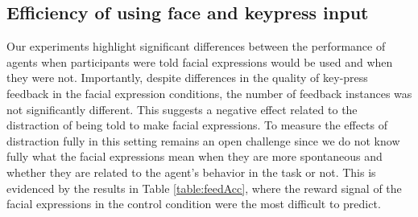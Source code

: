 
\subsection{Efficiency of using face and keypress input}
Our experiments highlight significant differences between the performance of agents when participants were told facial expressions would be used and when they were not. Importantly, despite differences in the quality of key-press feedback in the facial expression conditions, the number of feedback instances was not significantly different. This suggests a negative effect related to the distraction %
of being told to make facial expressions. To measure the effects of distraction %
fully in this setting remains an open challenge since we do not know fully what the facial expressions mean when they are more spontaneous and whether they are related to the agent's behavior in the task or not. This is evidenced by the results in Table \ref{table:feedAcc}, where the reward signal of the facial expressions in the control condition were the most difficult to predict. 

